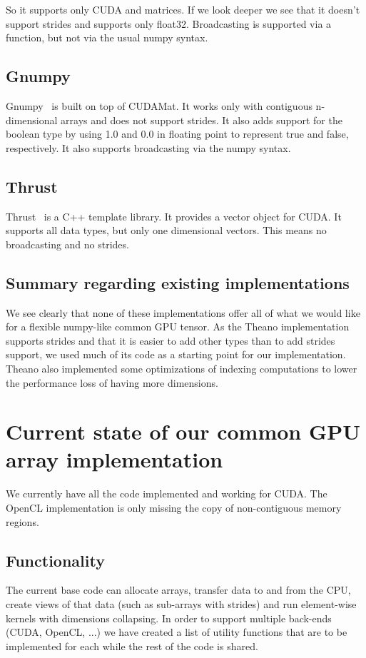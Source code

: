\documentclass{article} %
\begin{document}
So it supports only CUDA and matrices. 
If we look deeper we see that it doesn't support strides and supports only float32. 
Broadcasting is supported via a function, but not via the usual numpy syntax.

\subsection{Gnumpy}
Gnumpy~\citep{gnumpy-TR2010} is built on top of CUDAMat.
It works only with contiguous n-dimensional arrays and does not support strides.
It also adds support for the boolean type by using 1.0 and 0.0 in floating point to represent true and false, respectively. 
It also supports broadcasting via the numpy syntax.

\subsection{Thrust}
Thrust~\citep{Thrust} is a C++ template library.
It provides a vector object for CUDA.
It supports all data types, but only one dimensional vectors.
This means no broadcasting and no strides.

\subsection{Summary regarding existing implementations}
We see clearly that none of these implementations offer all of what we would like for a flexible numpy-like common GPU tensor.
As the Theano implementation supports strides and that it is easier to add other types than to add strides support, we used much of its code as a starting point for our implementation.
Theano also implemented some optimizations of indexing computations to lower the performance loss of having more dimensions.

\section{Current state of our common GPU array implementation}
\label{sec:currentimpl}
We currently have all the code implemented and working for CUDA.
The OpenCL implementation is only missing the copy of non-contiguous memory regions.

\subsection{Functionality}

The current base code can allocate arrays, transfer data to and from the CPU, create views of that data (such as sub-arrays with strides) and run element-wise kernels with dimensions collapsing.
In order to support multiple back-ends (CUDA, OpenCL, ...) we have created a list of utility functions that are to be implemented for each 
while the rest of the code is shared.
\end{document}
